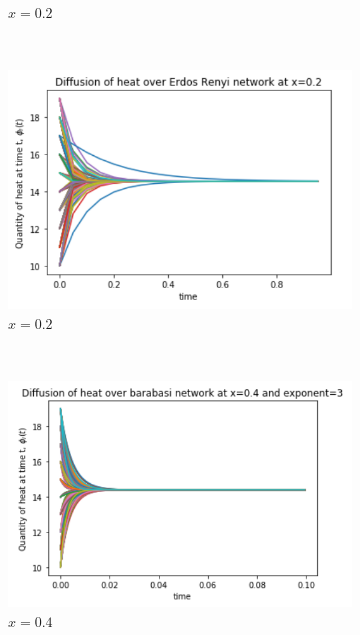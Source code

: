\documentclass[10pt,a4paper]{article}
\begin{document}
\begin{figure}[H]
\begin{subfigure}[b]{0.45\textwidth}
     		\caption{$x=0.2$}
     		\label{barabasi-x02}
     	\end{subfigure}~
     	\begin{subfigure}[b]{0.45\textwidth}
     		\includegraphics[width= \textwidth]{images/erdos-x02.png}
     		\caption{$x=0.2$}
     		\label{erdos-x02}
     	\end{subfigure}\\
     	\begin{subfigure}[b]{0.45\textwidth}
     		\includegraphics[width= \textwidth]{images/barabasi-x04.png}
     		\caption{$x=0.4$}
     		\label{barabasi-x04}
     	\end{subfigure}~
     	\begin{subfigure}[b]{0.45\textwidth}

\end{subfigure}
\end{figure}
\end{document}
